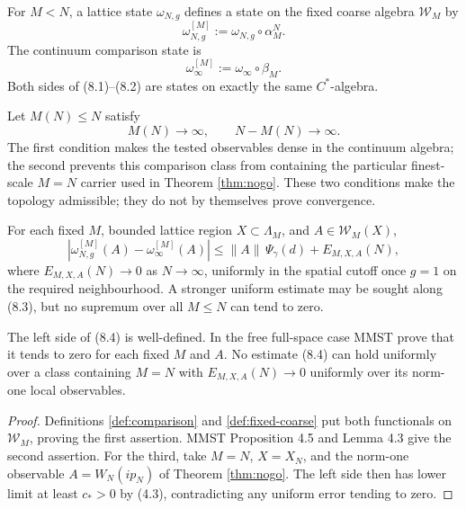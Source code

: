 \documentclass[11pt,a4paper]{article}
\newcommand{\W}{\mathcal W}
\begin{document}
\begin{definition}\label{def:fixed-coarse}
For $M<N$, a lattice state $\omega_{N,g}$ defines a state on the fixed coarse algebra
$\W_M$ by
\[
 \omega_{N,g}^{[M]}:=\omega_{N,g}\circ\alpha_M^N.               \tag{8.1}
\]
The continuum comparison state is
\[
 \omega_\infty^{[M]}:=\omega_\infty\circ\beta_M.                \tag{8.2}
\]
Both sides of (8.1)--(8.2) are states on exactly the same $C^*$-algebra.
\end{definition}

\begin{definition}\label{def:separated}
Let $M(N)\leq N$ satisfy
\[
 M(N)\to\infty,\qquad N-M(N)\to\infty.                          \tag{8.3}
\]
The first condition makes the tested observables dense in the continuum algebra; the
second prevents this comparison class from containing the particular finest-scale
$M=N$ carrier used in Theorem \ref{thm:nogo}.  These two conditions make the topology
admissible; they do not by themselves prove convergence.
\end{definition}

\begin{definition}\label{def:corrected-target}
For each fixed $M$, bounded lattice region $X\subset\Lambda_M$, and
$A\in\W_M(X)$,
\[
 \left|\omega_{N,g}^{[M]}(A)-\omega_\infty^{[M]}(A)\right|
 \leq \|A\|\,\Psi_\gamma(d)+E_{M,X,A}(N),                       \tag{8.4}
\]
where $E_{M,X,A}(N)\to0$ as $N\to\infty$, uniformly in the spatial cutoff
once $g=1$ on the required neighbourhood.  A stronger uniform estimate may be sought
along (8.3), but no supremum over all $M\leq N$ can tend to zero.
\end{definition}

\begin{proposition}\label{prop:target-status}
The left side of (8.4) is well-defined.  In the free full-space case MMST prove that it
tends to zero for each fixed $M$ and $A$.  No estimate (8.4) can hold uniformly over a
class containing $M=N$ with $E_{M,X,A}(N)\to0$ uniformly over its norm-one local
observables.
\end{proposition}

\begin{proof}
Definitions \ref{def:comparison} and \ref{def:fixed-coarse} put both functionals on
$\W_M$, proving the first assertion.  MMST Proposition 4.5 and Lemma 4.3 give the
second assertion.  For the third, take $M=N$, $X=X_N$, and the norm-one observable
$A=W_N(ip_N)$ of Theorem \ref{thm:nogo}.  The left side then has lower limit at least
$c_*>0$ by (4.3), contradicting any uniform error tending to zero.
\end{proof}
\end{document}
